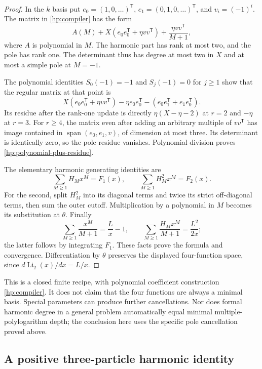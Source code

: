 \begin{proof}
In the $k$ basis put $e_0=(1,0,\ldots)^{\mathsf T}$,
$e_1=(0,1,0,\ldots)^{\mathsf T}$, and
$v_i=(-1)^i$. The matrix in \eqref{hp:compiler} has the form
\[
 A(M)+X(e_0e_0^{\mathsf T}+\eta vv^{\mathsf T})
                       +\frac{\eta vv^{\mathsf T}}{M+1},
\]
where $A$ is polynomial in $M$. The harmonic part has rank at
most two, and the pole has rank one. The determinant thus has
degree at most two in $X$ and at most a simple pole at $M=-1$.

The polynomial identities $S_0(-1)=-1$ and $S_j(-1)=0$ for
$j\ge1$ show that the regular matrix at that point is
\[
 X(e_0e_0^{\mathsf T}+\eta vv^{\mathsf T})
              -\eta e_0e_0^{\mathsf T}
              -(e_0e_1^{\mathsf T}+e_1e_0^{\mathsf T}).
\]
Its residue after the rank-one update is directly
$\eta(X-\eta-2)$ at $r=2$ and $-\eta$ at $r=3$.
For $r\ge4$, the matrix even after adding an arbitrary multiple
of $vv^{\mathsf T}$ has image contained in
$\operatorname{span}(e_0,e_1,v)$, of dimension at most three.
Its determinant is identically zero, so the pole residue
vanishes. Polynomial division proves
\eqref{hp:polynomial-plus-residue}.

The elementary harmonic generating identities are
\[
 \sum_{M\ge1}H_Mx^M=F_1(x),\qquad
 \sum_{M\ge1}H_M^2x^M=F_2(x).
\]
For the second, split $H_M^2$ into its diagonal terms and twice
its strict off-diagonal terms, then sum the outer cutoff.
Multiplication by a polynomial in $M$ becomes its substitution
at $\theta$. Finally
\[
 \sum_{M\ge1}\frac{x^M}{M+1}=\frac Lx-1,\qquad
 \sum_{M\ge1}\frac{H_Mx^M}{M+1}=\frac{L^2}{2x};
\]
the latter follows by integrating $F_1$. These facts prove the
formula and convergence. Differentiation by $\theta$ preserves
the displayed four-function space, since
$d\operatorname{Li}_2(x)/dx=L/x$.
\end{proof}

This is a closed finite recipe, with polynomial coefficient
construction \eqref{hp:compiler}. It does not claim that the
four functions are always a minimal basis. Special parameters
can produce further cancellations. Nor does formal harmonic
degree in a general problem automatically equal minimal
multiple-polylogarithm depth; the conclusion here uses the
specific pole cancellation proved above.

\subsection{A positive three-particle harmonic identity}

